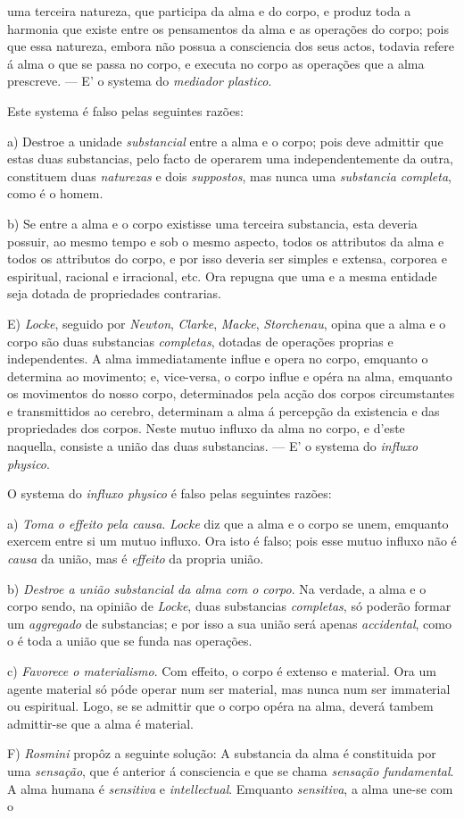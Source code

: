 uma terceira natureza, que participa da alma e do corpo, e produz toda a harmonia que existe entre os pensamentos da alma e as operações do corpo; pois que essa natureza, embora não possua a consciencia dos seus actos, todavia refere á alma o que se passa no corpo, e executa no corpo as operações que a alma prescreve. --- E' o systema do \emph{mediador plastico}.\par Este systema é falso pelas seguintes razões:\par a) Destroe a unidade \emph{substancial} entre a alma e o corpo; pois deve admittir que estas duas substancias, pelo facto de operarem uma independentemente da outra, constituem duas \emph{naturezas} e dois \emph{suppostos}, mas nunca uma \emph{substancia completa}, como é o homem.\par b) Se entre a alma e o corpo existisse uma terceira substancia, esta deveria possuir, ao mesmo tempo e sob o mesmo aspecto, todos os attributos da alma e todos os attributos do corpo, e por isso deveria ser simples e extensa, corporea e espiritual, racional e irracional, etc. Ora repugna que uma e a mesma entidade seja dotada de propriedades contrarias.\par E) \emph{Locke}, seguido por \emph{Newton}, \emph{Clarke}, \emph{Macke}, \emph{Storchenau}, opina que a alma e o corpo são duas substancias \emph{completas}, dotadas de operações proprias e independentes. A alma immediatamente influe e opera no corpo, emquanto o determina ao movimento; e, vice-versa, o corpo influe e opéra na alma, emquanto os movimentos do nosso corpo, determinados pela acção dos corpos circumstantes e transmittidos ao cerebro, determinam a alma á percepção da existencia e das propriedades dos corpos. Neste mutuo influxo da alma no corpo, e d'este naquella, consiste a união das duas substancias. --- E' o systema do \emph{influxo physico}.\par O systema do \emph{influxo physico} é falso pelas seguintes razões:\par a) \emph{Toma o effeito pela causa}. \emph{Locke} diz que a alma e o corpo se unem, emquanto exercem entre si um mutuo influxo. Ora isto é falso; pois esse mutuo influxo não é \emph{causa} da união, mas é \emph{effeito} da propria união.\par b) \emph{Destroe a união substancial da alma com o corpo}. Na verdade, a alma e o corpo sendo, na opinião de \emph{Locke}, duas substancias \emph{completas}, só poderão formar um \emph{aggregado} de substancias; e por isso a sua união será apenas \emph{accidental}, como o é toda a união que se funda nas operações.\par c) \emph{Favorece o materialismo}. Com effeito, o corpo é extenso e material. Ora um agente material só póde operar num ser material, mas nunca num ser immaterial ou espiritual. Logo, se se admittir que o corpo opéra na alma, deverá tambem admittir-se que a alma é material.\par F) \emph{Rosmini} propôz a seguinte solução: A substancia da alma é constituida por uma \emph{sensação}, que é anterior á consciencia e que se chama \emph{sensação fundamental}. A alma humana é \emph{sensitiva} e \emph{intellectual}. Emquanto \emph{sensitiva}, a alma une-se com o 